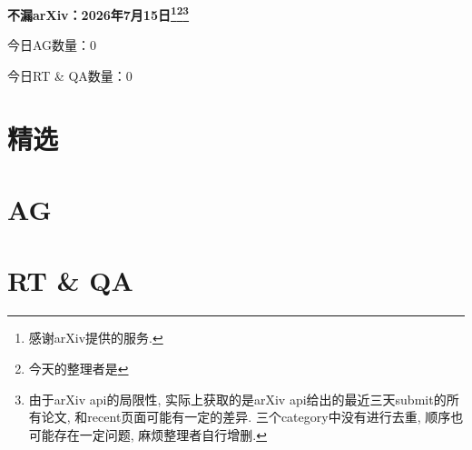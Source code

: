 \documentclass[9pt, a4paper]{article}
\theoremstyle{plain}
\theoremstyle{definition}
\theoremstyle{remark}
\newcommand{\AGnumber}{0}
\newcommand{\RTQAnumber}{0}
\newcommand{\NewestDate}{2026年7月15日}
\newcommand{\todayarXiver}{} %
\begin{document}
\begin{center}
    \Huge\textbf{不漏arXiv：\NewestDate\footnote{感谢arXiv提供的服务.}\footnote{今天的整理者是\todayarXiver}\footnote{由于arXiv api的局限性, 实际上获取的是arXiv api给出的最近三天submit的所有论文, 和recent页面可能有一定的差异. 三个category中没有进行去重, 顺序也可能存在一定问题, 麻烦整理者自行增删.}} \\
\end{center}

\setcounter{section}{-1}

\begin{center}
    今日AG数量：\AGnumber
    
    今日RT \& QA数量：\RTQAnumber
    
\end{center}


\section{精选}


\section{AG}

\section{RT \& QA}
\end{document}
